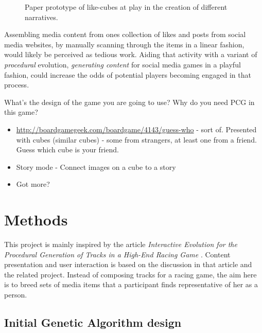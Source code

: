 \documentclass[]{article}
\begin{document}
\begin{figure}[htp]
	\caption{Paper prototype of like-cubes at play in the creation of different narratives.}
	\label{fig:narratives}
\end{figure}

Assembling media content from ones collection of likes and posts from social media websites, by manually scanning through the items in a linear fashion, would likely be perceived as tedious work.  Aiding that activity with a variant of \textit{procedural} evolution, \textit{generating content} for social media games in a playful fashion, could increase the odds of potential players becoming engaged in that process.


\begin{framed}
What’s the design of the game you are going to use? Why do you need PCG in this game?
\end{framed}
\begin{itemize}
\item \href{Guess who}{http://boardgamegeek.com/boardgame/4143/guess-who} - sort of. Presented with cubes (similar cubes) - some from strangers, at least one from a friend. Guess which cube is your friend.
\item Story mode - Connect images on a cube to a story
\item Got more?
\end{itemize}




\section{Methods}
\label{sec:Methods}

This project is mainly inspired by the article \textit{Interactive Evolution for the Procedural Generation of Tracks in a High-End Racing Game} \cite{cardamone2011interactive}.  Content presentation and user interaction is based on the discussion in that article and the related project.  Instead of composing tracks for a racing game, the aim here is to breed sets of media items that a participant finds representative of her as a person.


\subsection{Initial Genetic Algorithm design}
\end{document}
